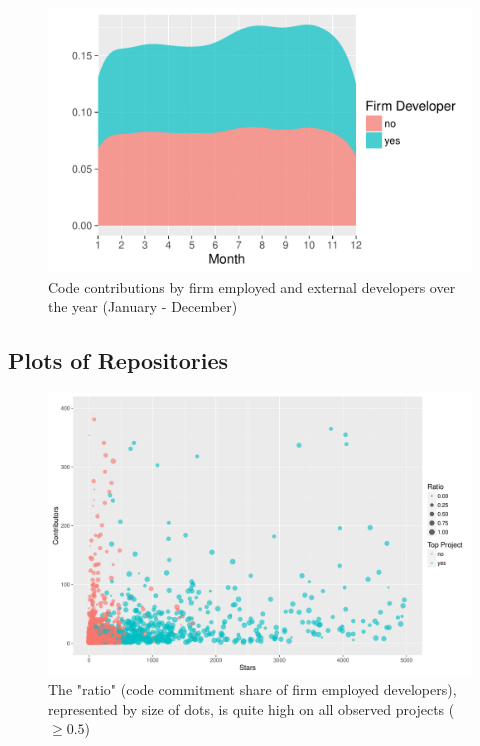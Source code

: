 \begin{figure}[!ht]
	\centering
	\includegraphics[page=1,scale=0.7]{../graphics/intro/month_of_code_contribution.pdf}
	\caption{Code contributions by firm employed and external developers over the year (January - December)}
	\label{fig:distribution_developer_commits_by_month}
\end{figure}

\subsection{Plots of Repositories}

\begin{figure}[h]
	\centering
	\label{fig:stars_contributors}
	\includegraphics[page=1,scale=0.35]{../graphics/intro/stars_contributors.pdf}
	\caption{The "ratio" (code commitment share of firm employed developers), represented by size of dots, is quite high on all observed projects ($\geq 0.5$)}
\end{figure}

